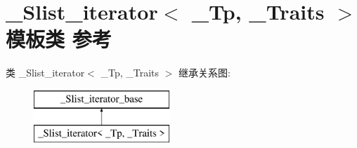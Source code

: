 \hypertarget{class___slist__iterator}{}\section{\+\_\+\+Slist\+\_\+iterator$<$ \+\_\+\+Tp, \+\_\+\+Traits $>$ 模板类 参考}
\label{class___slist__iterator}
类 \+\_\+\+Slist\+\_\+iterator$<$ \+\_\+\+Tp, \+\_\+\+Traits $>$ 继承关系图\+:\begin{figure}[H]
\begin{center}
\leavevmode
\includegraphics[height=2.000000cm]{class___slist__iterator}
\end{center}
\end{figure}
